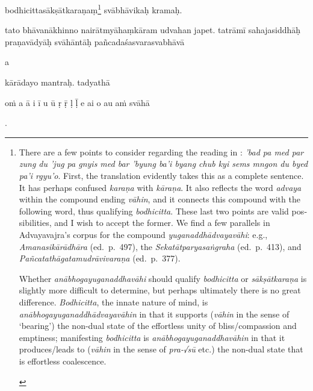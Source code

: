 \documentclass[naipra.tex]{subfiles}
\begin{document}
\begin{sanskrit}
\pstart
{} bodhicittasākṣātkaraṇaṃ\footnote{\begin{english}
	There are a few points to consider regarding the reading in \TIB : \emph{'bad pa med par zung du 'jug pa gnyis med bar 'byung ba'i byang chub kyi sems mngon du byed pa'i rgyu'o}.
	First, the translation evidently takes this as a complete sentence.
	It has perhaps confused \emph{karaṇa} with \emph{kāraṇa}.
	It also reflects the word \emph{advaya} within the compound ending \emph{vāhin}, and it connects this compound with the following word, thus qualifying \emph{bodhicitta}.
	These last two points are valid possibilities, and I wish to accept the former.
	We find a few parallels in Advayavajra's corpus for the compound \emph{yuganaddhādvayavāhi}: e.g., \emph{Amanasikārādhāra} (ed.\ p.\ 497), the \emph{Sekatātparyasaṅgraha} (ed.\ p.\ 413), and \emph{Pañcatathāgatamudrāvivaraṇa} (ed.\ p.\ 377). 

	Whether \emph{anābhogayuganaddhavāhi} should qualify \emph{bodhicitta} or \emph{sākṣātkaraṇa} is slightly more difficult to determine, but perhaps ultimately there is no great difference.
	\emph{Bodhicitta}, the innate nature of mind, is \emph{anābhogayuganaddhādvayavāhin} in that it supports (\emph{vāhin} in the sense of `bearing') the non-dual state of the effortless unity of bliss/compassion and emptiness; manifesting \emph{bodhicitta} is \emph{anābhogayuganaddhavāhin} in that it produces/leads to (\emph{vāhin} in the sense of \emph{pra-√sū} etc.) the non-dual state that is effortless coalescence.%
\end{english}} svābhāvikaḥ kramaḥ. 
\pend


\pstart
tato bhāvanākhinno nairātmyāhaṃkāram udvahan  japet.
tatrāmī sahajasiddhāḥ praṇavādyāḥ svāhāntāḥ pañcadaśasvarasvabhāvā \begin{mantra}a\end{mantra}\dsh kārādayo mantraḥ. tadyathā\Emdash \begin{mantra}oṁ a ā i ī u ū ṛ ṝ ḷ ḹ e ai o au aṁ svāhā\end{mantra}.
\pend


\end{sanskrit}
\end{document}
